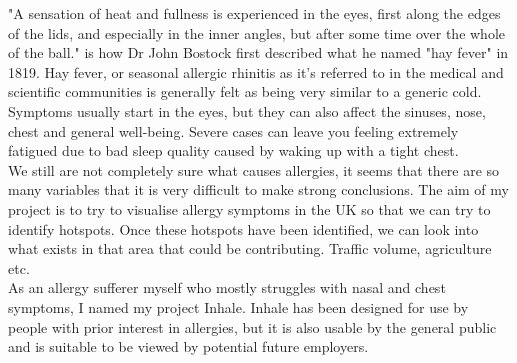"A sensation of heat and fullness is experienced in the eyes, first along the edges of the lids, and especially in the inner angles, but after some time over the whole of the ball." is how Dr John Bostock first described what he named "hay fever" in 1819. Hay fever, or seasonal allergic rhinitis as it's referred to in the medical and scientific communities is generally felt as being very similar to a generic cold. Symptoms usually start in the eyes, but they can also affect the sinuses, nose, chest and general well-being. Severe cases can leave you feeling extremely fatigued due to bad sleep quality caused by waking up with a tight chest.\\

We still are not completely sure what causes allergies, it seems that there are so many variables that it is very difficult to make strong conclusions. The aim of my project is to try to visualise allergy symptoms in the UK so that we can try to identify hotspots. Once these hotspots have been identified, we can look into what exists in that area that could be contributing. Traffic volume, agriculture etc.\\

As an allergy sufferer myself who mostly struggles with nasal and chest symptoms, I named my project Inhale. Inhale has been designed for use by people with prior interest in allergies, but it is also usable by the general public and is suitable to be viewed by potential future employers.